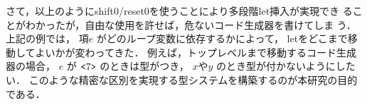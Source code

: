 %
%
%
%
%

さて，以上のようにshift0/reset0を使うことにより多段階let挿入が実現でき
ることがわかったが，自由な使用を許せば，危ないコード生成器を書けてしま
う．上記の例では，
項$e$ がどのループ変数に依存するかによって，
letをどこまで移動してよいかが変わってきた．
例えば，トップレベルまで移動するコード生成器の場合，
$e$ が $\texttt{<}{7}\texttt{>}$ のときは型がつき，
$x$や$y$ のとき型が付かないようにしたい．
このような精密な区別を実現する型システムを構築するのが本研究の目的である．

